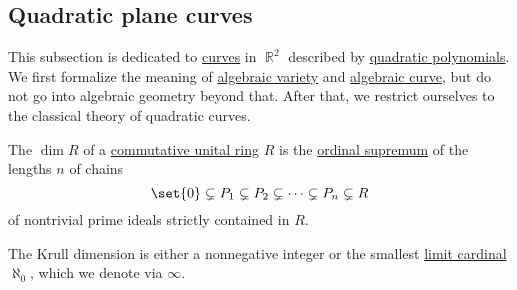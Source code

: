 \subsection{Quadratic plane curves}\label{subsec:quadratic_plane_curves}

This subsection is dedicated to \hyperref[rem:geometric_shape/algebraic]{curves} in \( \BbbR^2 \) described by \hyperref[def:polynomial_degree]{quadratic polynomials}. We first formalize the meaning of \hyperref[def:affine_algebraic_set/variety]{algebraic variety} and \hyperref[def:affine_algebraic_set/curve]{algebraic curve}, but do not go into algebraic geometry beyond that. After that, we restrict ourselves to the classical theory of quadratic curves.

\begin{definition}\label{def:krull_dimension}
  The  \( \dim R \) of a \hyperref[def:ring/commutative]{commutative unital ring} \( R \) is the \hyperref[thm:union_of_set_of_ordinals/supremum]{ordinal supremum} of the lengths \( n \) of chains
  \begin{equation*}
    \set{ 0 } \subsetneq P_1 \subsetneq P_2 \subsetneq \cdots \subsetneq P_n \subsetneq R
  \end{equation*}
  of nontrivial prime ideals strictly contained in \( R \).

  The Krull dimension is either a nonnegative integer or the smallest \hyperref[def:successor_and_limit_cardinal/weak_limit]{limit cardinal} \( \aleph_0 \), which we denote via \( \infty \).
\end{definition}

